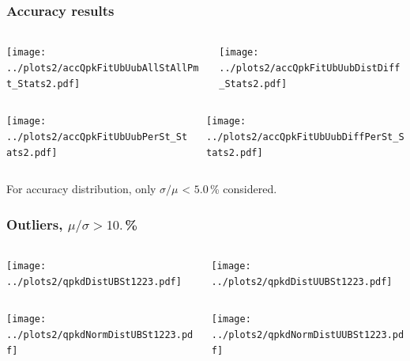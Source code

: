 \documentclass[aspectratio=169]{beamer}
\begin{document}
\begin{frame}
  \frametitle{Accuracy results}
  \vspace{0.5cm}
  \begin{columns}
    \begin{column}{0.5\textwidth}
      \texttt{[image: ../plots2/accQpkFitUbUubAllStAllPmt\_Stats2.pdf]}
    \end{column}
    \begin{column}{0.5\textwidth}
      \texttt{[image: ../plots2/accQpkFitUbUubDistDiff\_Stats2.pdf]}
    \end{column}
  \end{columns}
  \begin{columns}
    \begin{column}{0.5\textwidth}
      \texttt{[image: ../plots2/accQpkFitUbUubPerSt\_Stats2.pdf]}
    \end{column}
    \begin{column}{0.5\textwidth}
      \texttt{[image: ../plots2/accQpkFitUbUubDiffPerSt\_Stats2.pdf]}
    \end{column}
  \end{columns}
  {\scriptsize For accuracy distribution, only $\sigma/\mu$ <
  $5.0$\,\% considered. }
\end{frame}

\begin{frame}
  \frametitle{Outliers, $\mu/\sigma > 10.$\,\%}
  \vspace{0.2cm}
  \begin{columns}
    \begin{column}{0.5\textwidth}
      \texttt{[image: ../plots2/qpkdDistUBSt1223.pdf]}
    \end{column}
    \begin{column}{0.5\textwidth}
      \texttt{[image: ../plots2/qpkdDistUUBSt1223.pdf]}
    \end{column}
  \end{columns}
  \begin{columns}
    \begin{column}{0.5\textwidth}
      \texttt{[image: ../plots2/qpkdNormDistUBSt1223.pdf]}
    \end{column}
    \begin{column}{0.5\textwidth}
      \texttt{[image: ../plots2/qpkdNormDistUUBSt1223.pdf]}
    \end{column}
  \end{columns}
\end{frame}
\end{document}
